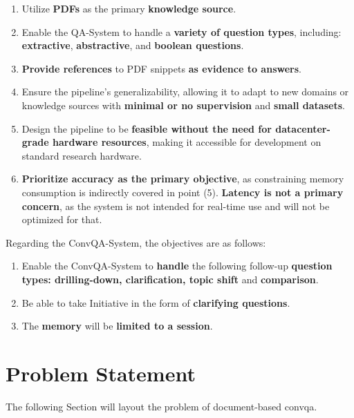 \begin{enumerate}
    \item Utilize \textbf{PDFs} as the primary \textbf{knowledge source}.
    \item Enable the QA-System to handle a \textbf{variety of question types}, including: \textbf{extractive}, \textbf{abstractive}, and \textbf{boolean questions}.
    \item \textbf{Provide references} to PDF snippets \textbf{as evidence to answers}.
    \item Ensure the pipeline's generalizability, allowing it to adapt to new domains or knowledge sources with \textbf{minimal or no supervision} and \textbf{small datasets}.
    \item Design the pipeline to be \textbf{feasible without the need for datacenter-grade hardware resources}, making it accessible for development on standard research hardware.
    \item \textbf{Prioritize accuracy as the primary objective}, as constraining memory consumption is indirectly covered in point (5). \textbf{Latency is not a primary concern}, as the system is not intended for real-time use and will not be optimized for that.
\end{enumerate}


Regarding the ConvQA-System, the objectives are as follows:

\begin{enumerate}
    \item Enable the ConvQA-System to \textbf{handle} the following follow-up \textbf{question types: drilling-down, clarification, topic shift} and \textbf{comparison}.
    \item Be able to take Initiative in the form of \textbf{clarifying questions}.
    \item The \textbf{memory} will be \textbf{limited to a session}.
\end{enumerate}

\section{Problem Statement}
\label{sec:problem_statement}

The following Section will layout the problem of document-based \gls{convqa}. 

